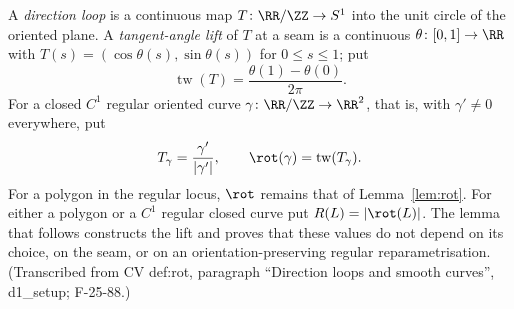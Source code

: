 \begin{definition}\label{cf:def-turning}\leanok
A \emph{direction loop} is a continuous map $T\colon\RR/\ZZ\to S^1$ into
the unit circle of the oriented plane. A \emph{tangent-angle lift} of $T$
at a seam is a continuous $\theta\colon[0,1]\to\RR$ with
$T(s)=(\cos\theta(s),\sin\theta(s))$ for $0\leq s\leq1$; put
\[
   \operatorname{tw}(T)=\frac{\theta(1)-\theta(0)}{2\pi}.
\]
For a closed $C^1$ regular oriented curve $\gamma\colon\RR/\ZZ\to\RR^2$,
that is, with $\gamma'\neq0$ everywhere, put
\[
   T_\gamma=\frac{\gamma'}{|\gamma'|},\qquad
   \rot(\gamma)=\operatorname{tw}(T_\gamma).
\]
For a polygon in the regular locus, $\rot$ remains that of
Lemma~\ref{lem:rot}. For either a polygon or a $C^1$ regular closed curve
put $R(L)=|\rot(L)|$. The lemma that follows constructs the lift and
proves that these values do not depend on its choice, on the seam, or on
an orientation-preserving regular reparametrisation. (Transcribed from CV
def:rot, paragraph ``Direction loops and smooth curves'', d1\_setup;
F-25-88.)
\end{definition}

